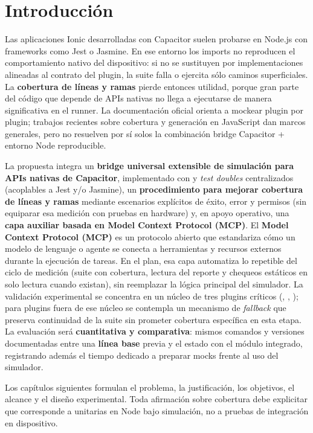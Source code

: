 \chapter{Introducción}
\label{chap:introduccion}

Las aplicaciones Ionic desarrolladas con Capacitor suelen probarse en Node.js con frameworks como Jest o Jasmine. En ese entorno los imports  no reproducen el comportamiento nativo del dispositivo: si no se sustituyen por implementaciones alineadas al contrato del plugin, la suite falla o ejercita sólo caminos superficiales. La \textbf{cobertura de líneas y ramas} pierde entonces utilidad, porque gran parte del código que depende de APIs nativas no llega a ejecutarse de manera significativa en el runner. La documentación oficial orienta a mockear plugin por plugin; trabajos recientes sobre cobertura y generación en JavaScript \cite{schafer2024testpilot,olsthoorn2024syntest_javascript} dan marcos generales, pero no resuelven por sí solos la combinación bridge Capacitor + entorno Node reproducible.

La propuesta integra un \textbf{bridge universal extensible de simulación para APIs nativas de Capacitor}, implementado con  y \textit{test doubles} centralizados (acoplables a Jest y/o Jasmine), un \textbf{procedimiento para mejorar cobertura de líneas y ramas} mediante escenarios explícitos de éxito, error y permisos (sin equiparar esa medición con pruebas en hardware) y, en apoyo operativo, una \textbf{capa auxiliar basada en Model Context Protocol (MCP)}. El \textbf{Model Context Protocol (MCP)} es un protocolo abierto que estandariza cómo un modelo de lenguaje o agente se conecta a herramientas y recursos externos durante la ejecución de tareas. En el plan, esa capa automatiza lo repetible del ciclo de medición (suite con cobertura, lectura del reporte y chequeos estáticos en solo lectura cuando existan), sin reemplazar la lógica principal del simulador. La validación experimental se concentra en un núcleo de tres plugins críticos (, , ); para plugins fuera de ese núcleo se contempla un mecanismo de \textit{fallback} que preserva continuidad de la suite sin prometer cobertura específica en esta etapa. La evaluación será \textbf{cuantitativa y comparativa}: mismos comandos y versiones documentadas entre una \textbf{línea base} previa y el estado con el módulo integrado, registrando además el tiempo dedicado a preparar mocks frente al uso del simulador.

Los capítulos siguientes formulan el problema, la justificación, los objetivos, el alcance y el diseño experimental. Toda afirmación sobre cobertura debe explicitar que corresponde a unitarias en Node bajo simulación, no a pruebas de integración en dispositivo.
